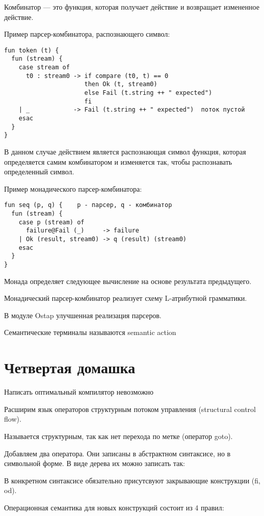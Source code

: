 Комбинатор --- это функция, которая получает действие и возвращает измененное
действие.

Пример парсер-комбинатора, распознающего символ:
\begin{verbatim}
fun token (t) {
  fun (stream) {
    case stream of
      t0 : stream0 -> if compare (t0, t) == 0
                      then Ok (t, stream0)
                      else Fail (t.string ++ " expected")
                      fi
    | _            -> Fail (t.string ++ " expected")  поток пустой
    esac
  }
}
\end{verbatim}

В данном случае действием является распознающая символ функция, которая
определяется самим комбинатором и изменяется так, чтобы распознавать
определенный символ.

Пример монадического парсер-комбинатора:
\begin{verbatim}
fun seq (p, q) {    p - парсер, q - комбинатор
  fun (stream) {
    case p (stream) of
      failure@Fail (_)     -> failure
    | Ok (result, stream0) -> q (result) (stream0)
    esac
  }
}
\end{verbatim}

Монада определяет следующее вычисление на основе результата предыдущего.

Монадический парсер-комбинатор реализует схему L-атрибутной грамматики.

В модуле Ostap улучшенная реализация парсеров.

Семантические терминалы называются semantic action

\section{Четвертая домашка}

Написать оптимальный компилятор невозможно

Расширим язык операторов структурным потоком управления (structural control
flow).

Называется структурным, так как нет перехода по метке (оператор goto).


Добавляем два оператора. Они записаны в абстрактном синтаксисе, но в символьной
форме. В виде дерева их можно записать так:


В конкретном синтаксисе обязательно присутсвуют закрывающие конструкции (fi,
od).

Операционная семантика для новых конструкций состоит из 4 правил:

